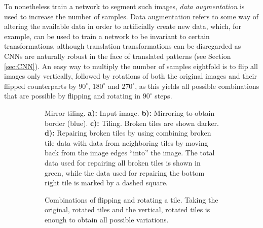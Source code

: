To nonetheless train a network to segment such images, \textit{data augmentation} is used to increase the number of samples. Data augmentation refers to some way of altering the available data in order to artificially create new data, which, for example, can be used to train a network to be invariant to certain transformations, although translation transformations can be disregarded as CNNs are naturally robust in the face of translated patterns (see Section \ref{sec:CNN}). An easy way to multiply the number of samples eightfold is to flip all images only vertically, followed by rotations of both the original images and their flipped counterparts by $90^{\circ}$, $180^{\circ}$ and $270^{\circ}$, as this yields all possible combinations that are possible by flipping and rotating in $90^{\circ}$ steps.\\


\begin {figure}[!ht]
	\begin {subfigure}[t]{0.5\linewidth}
		\scalebox{0.5}{}

		\caption*{Mirror tiling. \textbf{a):} Input image. \textbf{b):} Mirroring to obtain border (blue). \textbf{c):} Tiling. Broken tiles are shown darker. \textbf{d):} Repairing broken tiles by using combining broken tile data with data from neighboring tiles by moving back from the image edges ``into'' the image. The total data used for repairing all broken tiles is shown in green, while the data used for repairing the bottom right tile is marked by a dashed square.}
	\end {subfigure}
	\hspace{1cm}
	\begin {subfigure}[t]{0.5\linewidth}
		\scalebox{0.5}{}

		\caption*{Combinations of flipping and rotating a tile. Taking the original, rotated tiles and the vertical, rotated tiles is enough to obtain all possible variations.}
	\end {subfigure}

		\caption[]{}
		\label{fig:tile_mirror_rotate}

\end {figure}


